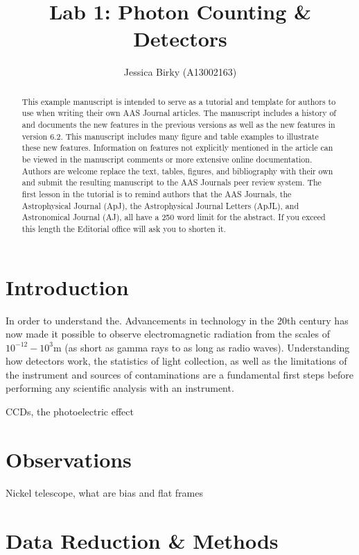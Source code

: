 \documentclass[preprint]{aastex62}
\begin{document}
\title{\sc Lab 1: Photon Counting \& Detectors}

\author{Jessica Birky (A13002163)}

\begin{abstract}
This example manuscript is intended to serve as a tutorial and template for
authors to use when writing their own AAS Journal articles. The manuscript
includes a history of and documents the new features in the
previous versions as well as the new features in version 6.2. This
manuscript includes many figure and table examples to illustrate these new
features.  Information on features not explicitly mentioned in the article
can be viewed in the manuscript comments or more extensive online
documentation. Authors are welcome replace the text, tables, figures, and
bibliography with their own and submit the resulting manuscript to the AAS
Journals peer review system.  The first lesson in the tutorial is to remind
authors that the AAS Journals, the Astrophysical Journal (ApJ), the
Astrophysical Journal Letters (ApJL), and Astronomical Journal (AJ), all
have a 250 word limit for the abstract.  If you exceed this length the
Editorial office will ask you to shorten it.

\end{abstract}
\bigskip

\section{Introduction} 
In order to understand the. Advancements in technology in the 20th century has now made it possible to observe electromagnetic radiation from the scales of $10^{-12}-10^3$m (as short as gamma rays to as long as radio waves). Understanding how detectors work, the statistics of light collection, as well as the limitations of the instrument and sources of contaminations are a fundamental first steps before performing any scientific analysis with an instrument.

CCDs, the photoelectric effect

\section{Observations}
Nickel telescope, what are bias and flat frames


\section{Data Reduction \& Methods}
\end{document}
